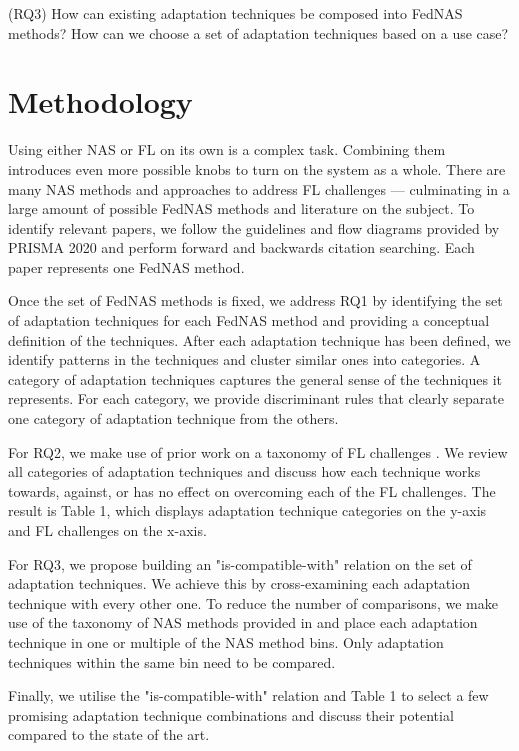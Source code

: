 \vspace{1em}
(RQ3) How can existing adaptation techniques be composed into FedNAS methods? How can we choose a set of adaptation techniques based on a use case?
\vspace{1em}

\section{Methodology}

Using either NAS or FL on its own is a complex task. Combining them introduces even more possible knobs to turn on the system as a whole. There are many NAS methods and approaches to address FL challenges — culminating in a large amount of possible FedNAS methods and literature on the subject. To identify relevant papers, we follow the guidelines and flow diagrams provided by PRISMA 2020 \cite{prisma_2020} and perform forward and backwards citation searching. Each paper represents one FedNAS method.

Once the set of FedNAS methods is fixed, we address RQ1 by identifying the set of adaptation techniques for each FedNAS method and providing a conceptual definition of the techniques. After each adaptation technique has been defined, we identify patterns in the techniques and cluster similar ones into categories. A category of adaptation techniques captures the general sense of the techniques it represents. For each category, we provide discriminant rules that clearly separate one category of adaptation technique from the others.

For RQ2, we make use of prior work on a taxonomy of FL challenges \cite{fl_taxonomy_2024}. We review all categories of adaptation techniques and discuss how each technique works towards, against, or has no effect on overcoming each of the FL challenges. The result is Table 1, which displays adaptation technique categories on the y-axis and FL challenges on the x-axis.

For RQ3, we propose building an "is-compatible-with" relation on the set of adaptation techniques. We achieve this by cross-examining each adaptation technique with every other one. To reduce the number of comparisons, we make use of the taxonomy of NAS methods provided in \cite{nas_1000_papers_2023} and place each adaptation technique in one or multiple of the NAS method bins. Only adaptation techniques within the same bin need to be compared.

Finally, we utilise the "is-compatible-with" relation and Table 1 to select a few promising adaptation technique combinations and discuss their potential compared to the state of the art.